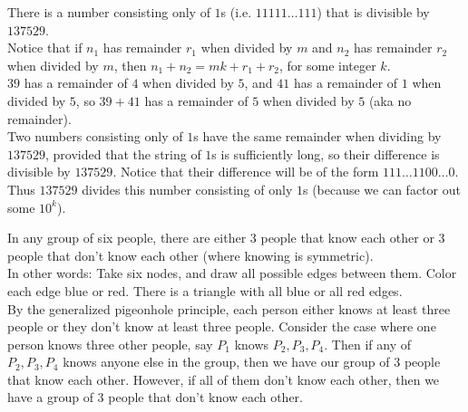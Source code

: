 \documentclass[class=article, crop=false]{standalone}
\begin{document}
  \begin{example}{}
    There is a number consisting only of $1$s (i.e. $11111\dotsc 111$) that is divisible by $137529$. \\[10pt]
    Notice that if $n_1$ has remainder $r_1$ when divided by $m$ and $n_2$ has remainder $r_2$ when divided by $m$, then $n_1+n_2=mk+r_1+r_2$, for some integer $k$. \\[10pt]
    $39$ has a remainder of $4$ when divided by $5$, and $41$ has a remainder of $1$ when divided by $5$, so $39+41$ has a remainder of $5$ when divided by $5$ (aka no remainder). \\[10pt]
    Two numbers consisting only of $1$s have the same remainder when dividing by $137529$, provided that the string of $1$s is sufficiently long, so their difference is divisible by $137529$. Notice that their difference will be of the form $111\dotsc 1100\dotsc 0$. Thus $137529$ divides this number consisting of only $1$s (because we can factor out some $10^k$).
  \end{example}
  \begin{example}{}
    In any group of six people, there are either $3$ people that know each other or $3$ people that don't know each other (where knowing is symmetric). \\[10pt]
    In other words: Take six nodes, and draw all possible edges between them. Color each edge blue or red. There is a triangle with all blue or all red edges. \\[10pt]
    By the generalized pigeonhole principle, each person either knows at least three people or they don't know at least three people. Consider the case where one person knows three other people, say $P_1$ knows $P_2, P_3, P_4$. Then if any of $P_2, P_3, P_4$ knows anyone else in the group, then we have our group of $3$ people that know each other. However, if all of them don't know each other, then we have a group of $3$ people that don't know each other.
  \end{example}
\end{document}
